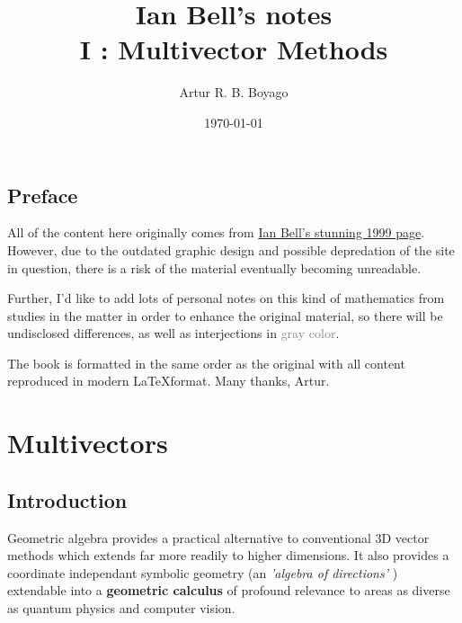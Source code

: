 \documentclass[a4paper]{book}
\numberwithin{equation}{chapter}
\begin{document}
\newcommand{\titulo}{\textbf{Ian Bell's notes}\\ \textbf{I : Multivector Methods}}
\newcommand{\abnTeX}{abn\TeX}

\title{\titulo}

\author{
Artur R. B. Boyago
}
\date{\today}

\maketitle

\tableofcontents

\section{Preface}

All of the content here originally comes from \href{http://www.iancgbell.clara.net/maths/geoalg.htm}{Ian Bell's
stunning 1999 page}. However,
due to the outdated graphic design and possible depredation of the site in question, there is a 
risk of the material eventually becoming unreadable.

\vspace{\baselineskip}

Further, I'd like to add lots of personal notes on this kind of mathematics from  studies
in the matter in order to enhance the original material, so there will be undisclosed
differences, as well as interjections in \textcolor{gray}{gray color}.

The book is formatted in the same order as the original
with all content reproduced in modern \LaTeX format. Many thanks, Artur.

\chapter{Multivectors}

\section{Introduction}

Geometric algebra provides a practical alternative to conventional 3D vector methods which extends far more 
readily to higher dimensions. It also provides a coordinate independant symbolic geometry (an \emph{'algebra of 
directions'} \cite{grassman1}) extendable into a \textbf{geometric calculus} \cite{hestenes1} of profound relevance to areas as diverse as quantum physics and computer vision.
\end{document}
